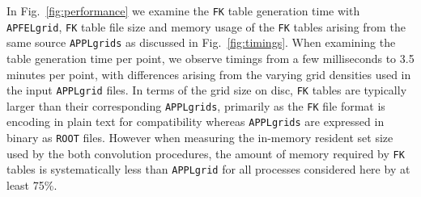 \documentclass[preprint,12pt]{elsarticle}
\begin{document}
In Fig.~\ref{fig:performance} we examine the {\tt FK} table generation time with {\tt APFELgrid}, {\tt FK} table file size and memory usage of the {\tt FK} tables arising from the same source {\tt APPLgrids} as discussed in Fig.~\ref{fig:timings}. 
When examining the table generation time per point, we observe timings from a few milliseconds to
3.5 minutes per point, with differences arising from the varying grid densities used in the input {\tt APPLgrid} files. 
In terms of the grid size on disc, {\tt FK} tables are typically larger than their corresponding {\tt APPLgrids}, primarily as the {\tt FK} file format is encoding in plain text for compatibility whereas {\tt APPLgrids} are expressed in binary as {\tt ROOT} files. However when
measuring the in-memory resident set size used by the both convolution procedures, the amount of memory required by {\tt FK} tables is systematically less than {\tt APPLgrid} for all processes considered here by at least 75\%.

\end{document}
